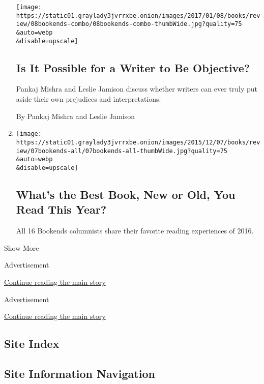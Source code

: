 \begin{enumerate}
  \texttt{[image: https://static01.graylady3jvrrxbe.onion/images/2017/01/08/books/review/08bookends-combo/08bookends-combo-thumbWide.jpg?quality=75\\\&auto=webp\\\&disable=upscale]}

  \hypertarget{is-it-possible-for-a-writer-to-be-objective}{%
  \subsection{Is It Possible for a Writer to Be
  Objective?}\label{is-it-possible-for-a-writer-to-be-objective}}

  Pankaj Mishra and Leslie Jamison discuss whether writers can ever
  truly put aside their own prejudices and interpretations.

  By Pankaj Mishra and Leslie Jamison
\item
  \href{/2016/12/21/books/review/whats-the-best-book-new-or-old-you-read-this-year.html}{}

  \texttt{[image: https://static01.graylady3jvrrxbe.onion/images/2015/12/07/books/review/07bookends-all/07bookends-all-thumbWide.jpg?quality=75\\\&auto=webp\\\&disable=upscale]}

  \hypertarget{whats-the-best-book-new-or-old-you-read-this-year}{%
  \subsection{What's the Best Book, New or Old, You Read This
  Year?}\label{whats-the-best-book-new-or-old-you-read-this-year}}

  All 16 Bookends columnists share their favorite reading experiences of
  2016.
\end{enumerate}

Show More

Advertisement

\protect\hyperlink{after-mid1}{Continue reading the main story}

Advertisement

\protect\hyperlink{after-mktg}{Continue reading the main story}

\hypertarget{site-index}{%
\subsection{Site Index}\label{site-index}}

\hypertarget{site-information-navigation}{%
\subsection{Site Information
Navigation}\label{site-information-navigation}}

